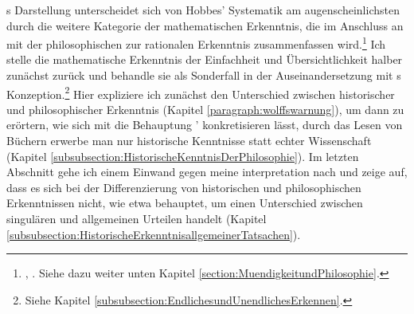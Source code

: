 s Darstellung unterscheidet sich von
Hobbes' Systematik am augenscheinlichsten durch die weitere Kategorie der
mathematischen Erkenntnis, die  im Anschluss an
 mit der
philosophischen zur rationalen Erkenntnis zusammenfassen
wird.\footnote{\cite[Vgl.][B 863--865]{Kant:KritikderreinenVernunft2003},
\cite[][III: 540.32--33, 541.18--20]{Kant:GesammelteWerke1900ff.}. Siehe dazu
weiter unten Kapitel \ref{section:MuendigkeitundPhilosophie}.} Ich stelle die
mathematische Erkenntnis der Einfachheit und Übersichtlichkeit halber zunächst
zurück und behandle sie als Sonderfall in der Auseinandersetzung mit
s Konzeption.\footnote{Siehe Kapitel
\ref{subsubsection:EndlichesundUnendlichesErkennen}.} Hier expliziere ich
zunächst den Unterschied zwischen historischer und philosophischer
Erkenntnis (Kapitel \ref{paragraph:wolffswarnung}), um dann zu
erörtern, wie sich mit  die
Behauptung ' konkretisieren lässt,
durch das Lesen von Büchern erwerbe man nur historische Kenntnisse statt echter
Wissenschaft (Kapitel \ref{subsubsection:HistorischeKenntnisDerPhilosophie}). Im
letzten Abschnitt gehe ich einem Einwand gegen meine
interpretation
nach und zeige auf, dass es sich bei der Differenzierung von historischen und
philosophischen Erkenntnissen nicht, wie etwa
 behauptet, um einen
Unterschied zwischen singulären und allgemeinen Urteilen handelt
(Kapitel \ref{subsubsection:HistorischeErkenntnisallgemeinerTatsachen}).

